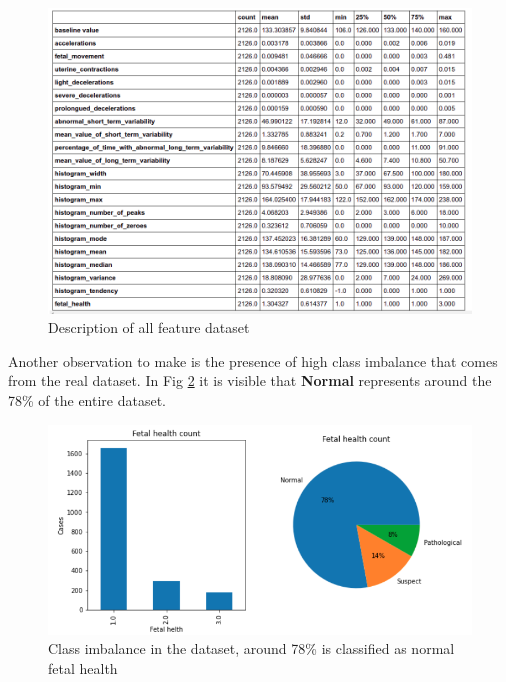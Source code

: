 \documentclass[a4paper,12pt]{article}
\begin{document}
\begin{figure}[H]
\begin{center}
\includegraphics[width=1.0\textwidth]{images/features.png}
\end{center}
\caption{Description of all feature dataset}
\label{fig:features}
\end{figure}

\noindent Another observation to make is the presence of high class imbalance that comes from the real dataset. In Fig \ref{fig:imbalance} it is visible that \textbf{Normal} represents around the 78\% of the entire dataset.

\begin{figure}[H]
\begin{center}
\includegraphics[width=1.0\textwidth]{images/imbalance.png}
\end{center}
\caption{Class imbalance in the dataset, around 78\% is classified as normal fetal health}
\label{fig:imbalance}
\end{figure}
\end{document}
